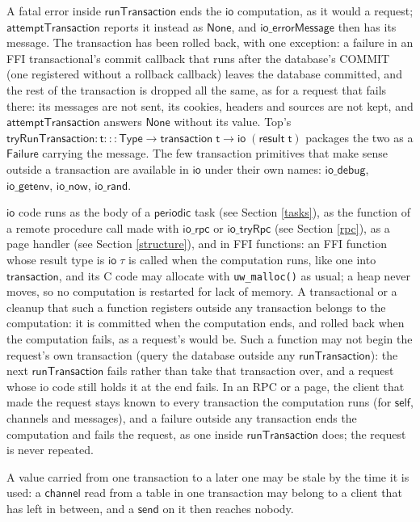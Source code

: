 \documentclass{article}
\newcommand{\mt}[1]{\mathsf{#1}}
\begin{document}
A fatal error inside $\mt{runTransaction}$ ends the $\mt{io}$ computation, as it would a request; $\mt{attemptTransaction}$ reports it instead as $\mt{None}$, and $\mt{io\_errorMessage}$ then has its message.  The transaction has been rolled back, with one exception: a failure in an FFI transactional's commit callback that runs after the database's COMMIT (one registered without a rollback callback) leaves the database committed, and the rest of the transaction is dropped all the same, as for a request that fails there: its messages are not sent, its cookies, headers and sources are not kept, and $\mt{attemptTransaction}$ answers $\mt{None}$ without its value.  Top's $\mt{tryRunTransaction} : \mt{t} ::: \mt{Type} \to \mt{transaction} \; \mt{t} \to \mt{io} \; (\mt{result} \; \mt{t})$ packages the two as a $\mt{Failure}$ carrying the message.  The few transaction primitives that make sense outside a transaction are available in $\mt{io}$ under their own names: $\mt{io\_debug}$, $\mt{io\_getenv}$, $\mt{io\_now}$, $\mt{io\_rand}$.

$\mt{io}$ code runs as the body of a $\mt{periodic}$ task (see Section \ref{tasks}), as the function of a remote procedure call made with $\mt{io\_rpc}$ or $\mt{io\_tryRpc}$ (see Section \ref{rpc}), as a page handler (see Section \ref{structure}), and in FFI functions: an FFI function whose result type is $\mt{io} \; \tau$ is called when the computation runs, like one into $\mt{transaction}$, and its C code may allocate with \texttt{uw\_malloc()} as usual; a heap never moves, so no computation is restarted for lack of memory.  A transactional or a cleanup that such a function registers outside any transaction belongs to the computation: it is committed when the computation ends, and rolled back when the computation fails, as a request's would be. Such a function may not begin the request's own transaction (query the database outside any $\mt{runTransaction}$): the next $\mt{runTransaction}$ fails rather than take that transaction over, and a request whose io code still holds it at the end fails. In an RPC or a page, the client that made the request stays known to every transaction the computation runs (for $\mt{self}$, channels and messages), and a failure outside any transaction ends the computation and fails the request, as one inside $\mt{runTransaction}$ does; the request is never repeated.

A value carried from one transaction to a later one may be stale by the time it is used: a $\mt{channel}$ read from a table in one transaction may belong to a client that has left in between, and a $\mt{send}$ on it then reaches nobody.
\end{document}
